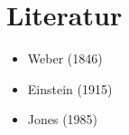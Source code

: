 \section{Literatur}
\begin{itemize}
    \item Weber (1846)
    \item Einstein (1915)
    \item Jones (1985)
\end{itemize}